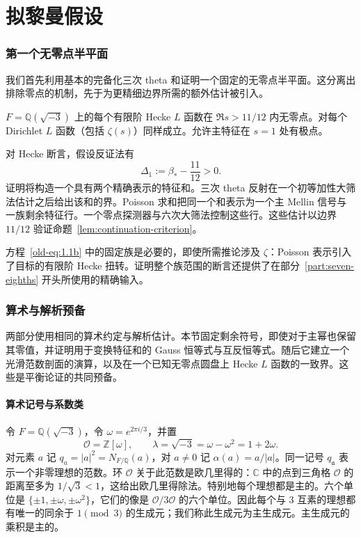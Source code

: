 \clearpage
\part{拟黎曼假设}
\label{part:eleven-twelfths}

\section{第一个无零点半平面}
\label{sec:first-stage}

我们首先利用基本的完备化三次 theta 和证明一个固定的无零点半平面。这分离出排除零点的机制，先于为更精细边界所需的额外估计被引入。

\begin{theorem}[在 $11/12$ 处的半平面]
\label{thm:eleven-twelfths}
$F=\mathbb Q(\sqrt{-3})$ 上的每个有限阶 Hecke $L$ 函数在 $\Re s>11/12$ 内无零点。对每个 Dirichlet $L$ 函数（包括 $\zeta(s)$）同样成立。允许主特征在 $s=1$ 处有极点。
\end{theorem}

对 Hecke 断言，假设反证法有
\begin{equation}
 \Delta_1:=\beta_*-\frac{11}{12}>0.
 \label{eq:first-stage-gap}
\end{equation}
证明将构造一个具有两个精确表示的特征和。三次 theta 反射在一个初等加性大筛法估计之后给出该和的界。Poisson 求和把同一个和表示为一个主 Mellin 信号与一族剩余特征行。一个零点探测器与六次大筛法控制这些行。这些估计以边界 $11/12$ 验证命题~\ref{lem:continuation-criterion}。

方程~\eqref{old-eq:1.1b} 中的固定族是必要的，即使所需推论涉及 $\zeta$：Poisson 表示引入了目标的有限阶 Hecke 扭转。证明整个族范围的断言还提供了在部分~\ref{part:seven-eighths} 开头所使用的精确输入。

\section{算术与解析预备}\label{sec:arithmetic}

两部分使用相同的算术约定与解析估计。本节固定剩余符号，即使对于主幂也保留其零值，并证明用于变换特征和的 Gauss 恒等式与互反恒等式。随后它建立一个光滑范数剖面的演算，以及在一个已知无零点圆盘上 Hecke $L$ 函数的一致界。这些是平衡论证的共同预备。

\subsection{算术记号与系数类}

令 $F=\mathbb Q(\sqrt{-3})$，令
$\omega=e^{2\pi i/3}$，并置
\[
 \mathcal O=\mathbb Z[\omega],\qquad
 \lambda=\sqrt{-3}=\omega-\omega^2=1+2\omega.
\]
对元素 $a$ 记 $q_a=|a|^2=N_{F/\mathbb Q}(a)$，对 $a\ne0$ 记 $\alpha(a)=a/|a|$。同一记号 $q_{\mathfrak a}$ 表示一个非零理想的范数。环 $\mathcal O$ 关于此范数是欧几里得的：$\mathbb C$ 中的点到三角格 $\mathcal O$ 的距离至多为 $1/\sqrt3<1$，这给出欧几里得除法。特别地每个理想都是主的。六个单位是 $\{\pm1,\pm\omega,\pm\omega^2\}$，它们的像是 $\mathcal O/3\mathcal O$ 的六个单位。因此每个与 $3$ 互素的理想都有唯一的同余于 $1\pmod3$ 的生成元；我们称此生成元为主生成元。主生成元的乘积是主的。

